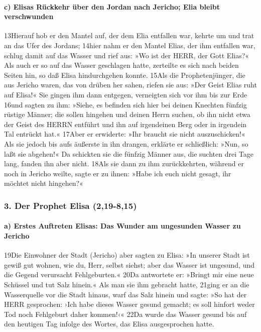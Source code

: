 \hypertarget{c-elisas-ruxfcckkehr-uxfcber-den-jordan-nach-jericho-elia-bleibt-verschwunden}{%
\paragraph{c) Elisas Rückkehr über den Jordan nach Jericho; Elia bleibt
verschwunden}\label{c-elisas-ruxfcckkehr-uxfcber-den-jordan-nach-jericho-elia-bleibt-verschwunden}}

13Hierauf hob er den Mantel auf, der dem Elia entfallen war, kehrte um
und trat an das Ufer des Jordans; 14hier nahm er den Mantel Elias, der
ihm entfallen war, schlug damit auf das Wasser und rief aus: »Wo ist der
HERR, der Gott Elias?« Als auch er so auf das Wasser geschlagen hatte,
zerteilte es sich nach beiden Seiten hin, so daß Elisa hindurchgehen
konnte. 15Als die Prophetenjünger, die aus Jericho waren, das von drüben
her sahen, riefen sie aus: »Der Geist Elias ruht auf Elisa!« Sie gingen
ihm dann entgegen, verneigten sich vor ihm bis zur Erde 16und sagten zu
ihm: »Siehe, es befinden sich hier bei deinen Knechten fünfzig rüstige
Männer; die sollen hingehen und deinen Herrn suchen, ob ihn nicht etwa
der Geist des HERRN entführt und ihn auf irgendeinen Berg oder in
irgendein Tal entrückt hat.« 17Aber er erwiderte: »Ihr braucht sie nicht
auszuschicken!« Als sie jedoch bis aufs äußerste in ihn drangen,
erklärte er schließlich: »Nun, so laßt sie abgehen!« Da schickten sie
die fünfzig Männer aus, die suchten drei Tage lang, fanden ihn aber
nicht. 18Als sie dann zu ihm zurückkehrten, während er noch in Jericho
weilte, sagte er zu ihnen: »Habe ich euch nicht gesagt, ihr möchtet
nicht hingehen?«

\hypertarget{der-prophet-elisa-219-815}{%
\subsubsection{3. Der Prophet Elisa
(2,19-8,15)}\label{der-prophet-elisa-219-815}}

\hypertarget{a-erstes-auftreten-elisas-das-wunder-am-ungesunden-wasser-zu-jericho}{%
\paragraph{a) Erstes Auftreten Elisas: Das Wunder am ungesunden Wasser
zu
Jericho}\label{a-erstes-auftreten-elisas-das-wunder-am-ungesunden-wasser-zu-jericho}}

19Die Einwohner der Stadt (Jericho) aber sagten zu Elisa: »In unserer
Stadt ist gewiß gut wohnen, wie du, Herr, selbst siehst; aber das Wasser
ist ungesund, und die Gegend verursacht Fehlgeburten.« 20Da antwortete
er: »Bringt mir eine neue Schüssel und tut Salz hinein.« Als man sie ihm
gebracht hatte, 21ging er an die Wasserquelle vor die Stadt hinaus, warf
das Salz hinein und sagte: »So hat der HERR gesprochen: ›Ich habe dieses
Wasser gesund gemacht; es soll hinfort weder Tod noch Fehlgeburt daher
kommen!‹« 22Da wurde das Wasser gesund bis auf den heutigen Tag infolge
des Wortes, das Elisa ausgesprochen hatte.

